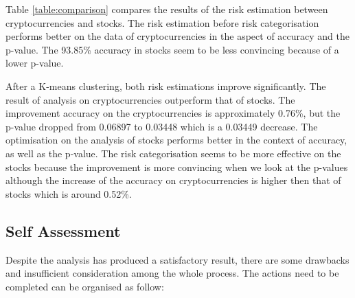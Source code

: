 \documentclass[11pt]{article} %
\theoremstyle{plain}
\theoremstyle{definition}
\begin{document}
Table \ref{table:comparison} compares the results of the risk estimation between cryptocurrencies and stocks. The risk estimation before risk categorisation performs better on the data of cryptocurrencies in the aspect of accuracy and the p-value. The 93.85\% accuracy in stocks seem to be less convincing because of a lower p-value.

After a K-means clustering, both risk estimations improve significantly. The result of analysis on cryptocurrencies outperform that of stocks. The improvement accuracy on the cryptocurrencies is approximately 0.76\%, but the p-value dropped from 0.06897 to 0.03448 which is a 0.03449 decrease. The optimisation on the analysis of stocks performs better in the context of accuracy, as well as the p-value. The risk categorisation seems to be more effective on the stocks because the improvement is more convincing when we look at the p-values although the increase of the accuracy on cryptocurrencies is higher then that of stocks which is around 0.52\%.

\subsection{Self Assessment}

Despite the analysis has produced a satisfactory result, there are some drawbacks and insufficient consideration among the whole process. The actions need to be completed can be organised as follow:
\end{document}
